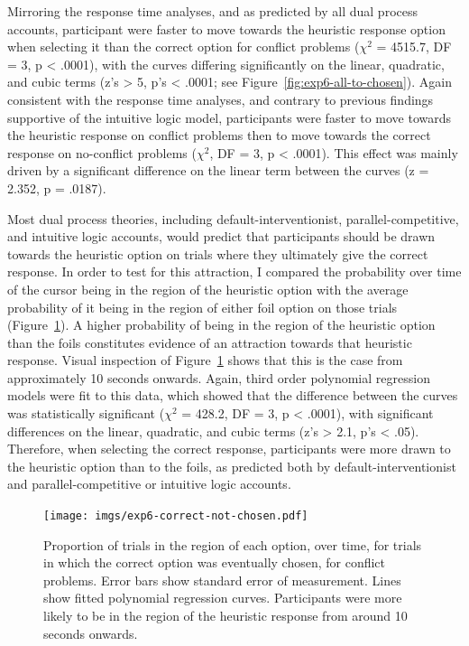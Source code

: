 Mirroring the response time analyses, and as predicted by all dual process accounts,
participant were faster to move towards
the heuristic response option when selecting it
than the correct option for conflict problems
($\chi^2$ = 4515.7, DF = 3, p < .0001),
with the curves differing significantly on the linear, quadratic, and cubic terms
(z's > 5, p's < .0001; see Figure~\ref{fig:exp6-all-to-chosen}).
Again consistent with the response time analyses,
and contrary to previous findings supportive of the intuitive logic model,
participants were faster to move towards the heuristic response on conflict problems
then to move towards the correct response on no-conflict problems
($\chi^2$, DF = 3, p < .0001).
This effect was mainly driven by a significant difference
on the linear term between the curves (z = 2.352, p = .0187).

Most dual process theories, including default-interventionist,
parallel-competitive, and intuitive logic accounts,
would predict that participants should be
drawn towards the heuristic option
on trials where they ultimately give the correct response.
In order to test for this attraction,
I compared the probability over time of
the cursor being in the region of the heuristic option
with the average probability of it being in the region of
either foil option on those trials (Figure~\ref{fig:exp6-correct-not-chosen}).
A higher probability of being in the region of the heuristic option
than the foils constitutes evidence of an attraction towards that heuristic response.
Visual inspection of Figure~\ref{fig:exp6-correct-not-chosen} shows that
this is the case from approximately 10 seconds onwards.
Again, third order polynomial regression models were fit to this data,
which showed that the difference between the curves was statistically significant
($\chi^2$ = 428.2, DF = 3, p < .0001),
with significant differences on the linear, quadratic, and cubic terms
(z's > 2.1, p's < .05).
Therefore, when selecting the correct response,
participants were more drawn to the heuristic option than to the foils,
as predicted both by default-interventionist
and parallel-competitive or intuitive logic accounts.

\begin{figure}[pt]
  \centering
  \texttt{[image: imgs/exp6-correct-not-chosen.pdf]}
  \caption[Proportion of cursor in region of other response options
  when correct response was given, Experiment 6.]{
    \label{fig:exp6-correct-not-chosen}
    Proportion of trials in the region of each option, over time,
    for trials in which the correct option was eventually chosen,
    for conflict problems.
    Error bars show standard error of measurement.
    Lines show fitted polynomial regression curves.
    Participants were more likely to be in the region of the heuristic response from around 10 seconds onwards.
  }
\end{figure}

